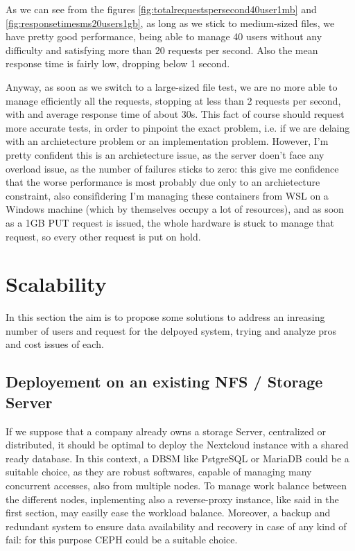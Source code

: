 \documentclass{article}
\begin{document}
	As we can see from the figures \ref{fig:totalrequestspersecond40user1mb} and \ref{fig:responsetimesms20users1gb}, as long as we stick to medium-sized files, we have pretty good performance, being able to manage 40 users without any difficulty and satisfying more than 20 requests per second. Also the mean response time is fairly low, dropping below 1 second.
	
	Anyway, as soon as we switch to a large-sized file test, we are no more able to manage efficiently all the requests, stopping at less than 2 requests per second, with and average response time of about 30s. This fact of course should request more accurate tests, in order to pinpoint the exact problem, i.e. if we are delaing with an archietecture problem or an implementation problem. However, I'm pretty confident this is an archietecture issue, as the server doen't face any overload issue, as the number of failures sticks to zero: this give me confidence that the worse performance is most probably due only to an archietecture constraint, also consifìdering I'm managing these containers from WSL on a Windows machine (which by themselves occupy a lot of resources), and as soon as a 1GB PUT request is issued, the whole hardware is stuck to manage that request, so every other request is put on hold.
	
	\section{Scalability}
	\label{sec:scalability}
	In this section the aim is to propose some solutions to address an inreasing number of users and request for the delpoyed system, trying and analyze pros and cost issues of each.
	
	\subsection{Deployement on an existing NFS / Storage Server}
	If we suppose that a company already owns a storage Server, centralized or distributed, it should be optimal to deploy the Nextcloud instance with a shared ready database. In this context, a DBSM like PstgreSQL or MariaDB could be a suitable choice, as they are robust softwares, capable of managing many concurrent accesses, also from multiple nodes. To manage work balance between the different nodes, inplementing also a reverse-proxy instance, like said in the first section, may easilly ease the workload balance. Moreover, a backup and redundant system to ensure data availability and recovery in case of any kind of fail: for this purpose CEPH could be a suitable choice.
	
\end{document}
